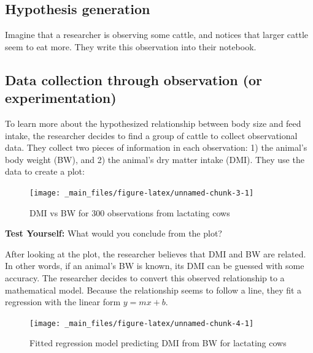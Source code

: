 \documentclass[
]{book}
\begin{document}
\hypertarget{hypothesis-generation}{%
\subsection{Hypothesis generation}\label{hypothesis-generation}}

Imagine that a researcher is observing some cattle, and notices that larger cattle seem to eat more. They write this observation into their notebook.

\hypertarget{data-collection-through-observation-or-experimentation}{%
\subsection{Data collection through observation (or experimentation)}\label{data-collection-through-observation-or-experimentation}}

To learn more about the hypothesized relationship between body size and feed intake, the researcher decides to find a group of cattle to collect observational data. They collect two pieces of information in each observation: 1) the animal's body weight (BW), and 2) the animal's dry matter intake (DMI). They use the data to create a plot:

\begin{figure}

{\centering \texttt{[image: \_main\_files/figure-latex/unnamed-chunk-3-1]} 

}

\caption{DMI vs BW for 300 observations from lactating cows}\label{fig:unnamed-chunk-3}
\end{figure}

\textbf{Test Yourself: }
What would you conclude from the plot?

After looking at the plot, the researcher believes that DMI and BW are related. In other words, if an animal's BW is known, its DMI can be guessed with some accuracy. The researcher decides to convert this observed relationship to a mathematical model. Because the relationship seems to follow a line, they fit a regression with the linear form \(y = mx + b\).

\begin{figure}

{\centering \texttt{[image: \_main\_files/figure-latex/unnamed-chunk-4-1]} 

}

\caption{Fitted regression model predicting DMI from BW for lactating cows}\label{fig:unnamed-chunk-4}
\end{figure}
\end{document}

